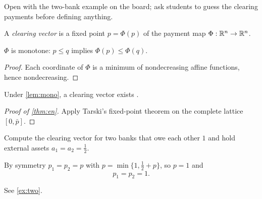 \label{lec:clearing}

\begin{teachnote}
    Open with the two-bank example on the board; ask students to guess the
    clearing payments before defining anything.
\end{teachnote}

\begin{definition}\label{def:clearing}
    A \emph{clearing vector} is a fixed point \(p=\Phi(p)\) of the payment map
    \(\Phi:\mathbb{R}^n\to\mathbb{R}^n\).
\end{definition}

\begin{lemma}\label{lem:mono}
    \(\Phi\) is monotone: \(p\le q\) implies \(\Phi(p)\le\Phi(q)\).
\end{lemma}
\begin{proof}
    Each coordinate of \(\Phi\) is a minimum of nondecreasing affine functions,
    hence nondecreasing.
\end{proof}

\begin{theorem}\label{thm:en}
    Under \cref{lem:mono}, a clearing vector exists \citep{example2020}.
\end{theorem}
\begin{proof}[Proof of \cref{thm:en}]
    Apply Tarski's fixed-point theorem on the complete lattice \([0,\bar p]\).
\end{proof}


\begin{exercise}\label{ex:two}
    Compute the clearing vector for two banks that owe each other \(1\) and hold
    external assets \(a_1=a_2=\tfrac12\).
\end{exercise}
\begin{solution}
    By symmetry \(p_1=p_2=p\) with \(p=\min\{1,\tfrac12+p\}\), so \(p=1\) and
    \[
        p_1 = p_2 = 1 .
    \]
\end{solution}

See \cref{ex:two}.